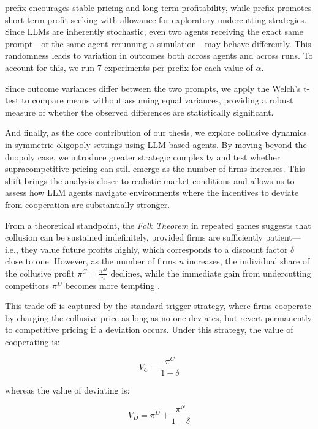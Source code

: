  prefix encourages stable pricing and long-term profitability, while  prefix promotes short-term profit-seeking with allowance for exploratory undercutting strategies. Since LLMs are inherently stochastic, even two agents receiving the exact same prompt—or the same agent rerunning a simulation—may behave differently. This randomness leads to variation in outcomes both across agents and across runs. To account for this, we run 7 experiments per prefix for each value of $\alpha$.


Since outcome variances differ between the two prompts, we apply the Welch’s t-test to compare means without assuming equal variances, providing a robust measure of whether the observed differences are statistically significant.


And finally, as the core contribution of our thesis, we explore collusive dynamics in symmetric oligopoly settings using LLM-based agents. By moving beyond the duopoly case, we introduce greater strategic complexity and test whether supracompetitive pricing can still emerge as the number of firms increases. This shift brings the analysis closer to realistic market conditions and allows us to assess how LLM agents navigate environments where the incentives to deviate from cooperation are substantially stronger.

From a theoretical standpoint, the \emph{Folk Theorem} in repeated games suggests that collusion can be sustained indefinitely, provided firms are sufficiently patient—i.e., they value future profits highly, which corresponds to a discount factor $\delta$ close to one. However, as the number of firms $n$ increases, the individual share of the collusive profit $\pi^C = \frac{\pi^M}{n}$ declines, while the immediate gain from undercutting competitors $\pi^D$ becomes more tempting \parencite{ivaldi_chapter_2007, tirole_theory_1988}.

This trade-off is captured by the standard trigger strategy, where firms cooperate by charging the collusive price as long as no one deviates, but revert permanently to competitive pricing if a deviation occurs. Under this strategy, the value of cooperating is:

\begin{equation}
    V_C = \frac{\pi^C}{1 - \delta}
\end{equation}

whereas the value of deviating is:

\begin{equation}
    V_D = \pi^D + \frac{\pi^N}{1 - \delta}
\end{equation}


